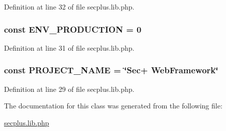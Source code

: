 Definition at line 32 of file secplus.lib.php.

\hypertarget{class_sec_plus_1_1_config_a80cb73e4bb4dd2a7d04b7303faf15852}{
\subsubsection[{ENV\_\-PRODUCTION}]{\setlength{\rightskip}{0pt plus 5cm}const {\bf ENV\_\-PRODUCTION} = 0}}
\label{class_sec_plus_1_1_config_a80cb73e4bb4dd2a7d04b7303faf15852}


Definition at line 31 of file secplus.lib.php.

\hypertarget{class_sec_plus_1_1_config_ae4ca0cededce7cacacca1c007b51ff29}{
\subsubsection[{PROJECT\_\-NAME}]{\setlength{\rightskip}{0pt plus 5cm}const {\bf PROJECT\_\-NAME} = \char`\"{}Sec+ {\bf WebFramework}\char`\"{}}}
\label{class_sec_plus_1_1_config_ae4ca0cededce7cacacca1c007b51ff29}


Definition at line 29 of file secplus.lib.php.



The documentation for this class was generated from the following file:\begin{DoxyCompactItemize}
\item 
\hyperlink{secplus_8lib_8php}{secplus.lib.php}\end{DoxyCompactItemize}
